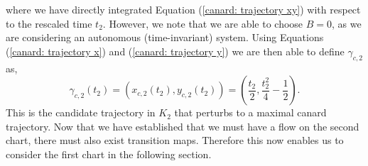 where we have directly integrated Equation (\ref{canard: trajectory xy}) with respect to the rescaled time $ t_2 $. However, we note that we are able to choose $B=0 $, as we are considering an autonomous (time-invariant) system. Using Equations (\ref{canard: trajectory x}) and (\ref{canard: trajectory y}) we are then able to define $ \gamma_{c,2} $ as, 
\begin{equation}
\gamma_{c,2}(t_2)=(x_{c,2}(t_2),y_{c,2}(t_2))=\left(\frac{t_2}{2},\frac{t^2_2}{4}-\frac{1}{2}\right).   \label{eq: gamma c2}
\end{equation}
This is the candidate trajectory in $K_2$ that perturbs to a maximal canard trajectory. Now that we have established that we must have a flow on the second chart, there must also exist transition maps. Therefore this now enables us to consider the first chart in the following section.


